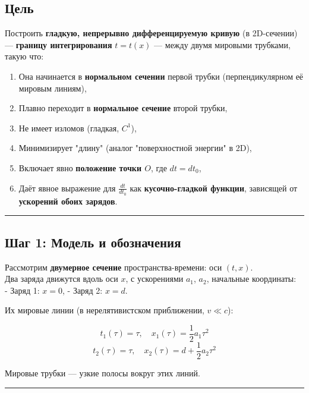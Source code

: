 \documentclass[11pt]{article}
\providecommand{\tightlist}{%
      \setlength{\itemsep}{0pt}\setlength{\parskip}{0pt}}
\begin{document}
\subsection{ Цель}

Построить \textbf{гладкую, непрерывно дифференцируемую кривую} (в
2D-сечении) --- \textbf{границу интегрирования} \(t = t(x)\) --- между
двумя мировыми трубками, такую что:

\begin{enumerate}
\def\labelenumi{\arabic{enumi}.}
\tightlist
\item
  Она начинается в \textbf{нормальном сечении} первой трубки
  (перпендикулярном её мировым линиям),
\item
  Плавно переходит в \textbf{нормальное сечение} второй трубки,
\item
  Не имеет изломов (гладкая, \(C^1\)),
\item
  Минимизирует "длину" (аналог "поверхностной энергии" в 2D),
\item
  Включает явно \textbf{положение точки \(O\)}, где \(dt = dt_0\),
\item
  Даёт явное выражение для \(\frac{dt}{dt_0}\) как
  \textbf{кусочно-гладкой функции}, зависящей от \textbf{ускорений обоих
  зарядов}.
\end{enumerate}

\begin{center}\rule{0.5\linewidth}{\linethickness}\end{center}

\subsection{ Шаг 1: Модель и обозначения}

Рассмотрим \textbf{двумерное сечение} пространства-времени: оси
\((t, x)\).\\
Два заряда движутся вдоль оси \(x\), с ускорениями \(a_1\), \(a_2\),
начальные координаты:\\
- Заряд 1: \(x = 0\), - Заряд 2: \(x = d\).

Их мировые линии (в нерелятивистском приближении, \(v \ll c\)):

\[
t_1(\tau) = \tau, \quad x_1(\tau) = \frac{1}{2} a_1 \tau^2
\] \[
t_2(\tau) = \tau, \quad x_2(\tau) = d + \frac{1}{2} a_2 \tau^2
\]

Мировые трубки --- узкие полосы вокруг этих линий.

\begin{center}\rule{0.5\linewidth}{\linethickness}\end{center}
\end{document}
